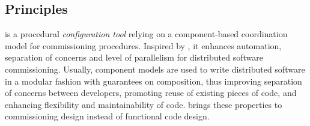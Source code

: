 
\subsection{Principles}

\mad is a procedural \emph{configuration tool} relying on a
component-based coordination model for commissioning
procedures. Inspired by \aeolus, it enhances automation, separation of
concerns and level of parallelism for distributed software
commissioning. Usually, component models are used to write distributed
software in a modular fashion with guarantees on composition,
thus improving separation of concerns between developers, promoting
reuse of existing pieces of code, and enhancing flexibility and
maintainability of code. \mad brings these properties to commissioning
design instead of functional code design.

